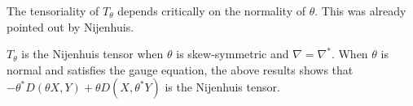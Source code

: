 \begin{rem}
    The tensoriality of $T_\theta$ depends critically on the normality of $\theta$. This was already pointed out by 
    Nijenhuis.
\end{rem}
\begin{rem}
    $T_\theta$ is the Nijenhuis tensor when $\theta$ is skew-symmetric and $\nabla = \nabla^*$. When $\theta$ is normal and satisfies the gauge equation,
    the above results shows that $-\theta^*D\left(  \theta X, Y\right)+\theta D\left( X,\theta^*Y \right)$ is the Nijenhuis tensor. 
\end{rem}